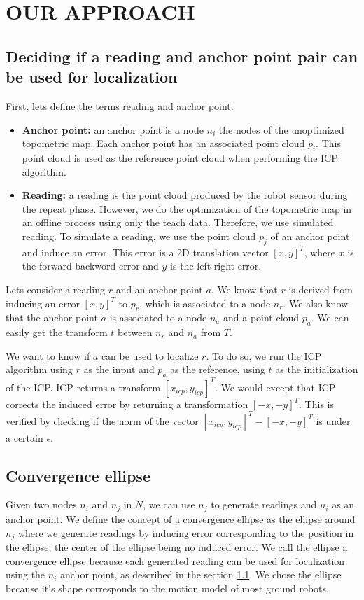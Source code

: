 \documentclass[letterpaper,10 pt,conference]{ieeeconf}
\begin{document}
\section{OUR APPROACH}
\label{approach}

\subsection{Deciding if a reading and anchor point pair can be used for localization}
\label{approach-deciding-converge}

First, lets define the terms reading and anchor point:

\begin{itemize}
  \item \textbf{Anchor point:} an anchor point is a node $n_i$ the nodes of the unoptimized
    topometric map. Each anchor point has an associated point cloud $p_i$. This point cloud is used
    as the reference point cloud when performing the ICP algorithm.
  \item \textbf{Reading:} a reading is the point cloud produced by the robot sensor during the
    repeat phase. However, we do the optimization of the topometric map in an offline process using
only the teach data. Therefore, we use simulated reading. To simulate a reading, we use the point
cloud $p_j$ of an anchor point and induce an error. This error is a 2D translation vector $[x,y]^T$, where $x$ is the forward-backword error and $y$ is the left-right error.
\end{itemize}

Lets consider a reading $r$ and an anchor point $a$. We know that $r$ is derived from inducing an error $[x, y]^T$ to $p_r$, which is associated to a node $n_r$.
We also know that the anchor point $a$ is associated to a node $n_a$ and a point cloud $p_a$. We can easily get the transform $t$ between $n_r$ and $n_a$ from $T$.


We want to know if $a$ can be used to localize $r$. To do so, we run the ICP algorithm using $r$ as the input and $p_a$ as the reference, using $t$
as the initialization of the ICP. ICP returns a transform $[x_{icp}, y_{icp}]^T$. We would except that ICP corrects the induced error by returning
a transformation $[-x, -y]^T$. This is verified by checking if the norm of the vector $[x_{icp}, y_{icp}]^T - [-x, -y]^T$ is under a certain $\epsilon$.


\subsection{Convergence ellipse}
Given two nodes $n_i$ and $n_j$ in $N$, we can use $n_j$ to generate readings and $n_i$ as an anchor
point.  We define the concept of a convergence ellipse as the ellipse around $n_j$ where we generate
readings by inducing error corresponding to the position in the ellipse, the center of the ellipse
being no induced error. We call the ellipse a convergence ellipse because each generated reading can
be used for localization using the $n_i$ anchor point, as described in the section
\ref{approach-deciding-converge}. We chose the ellipse because it's shape corresponds to the motion model of most ground robots.
\end{document}
